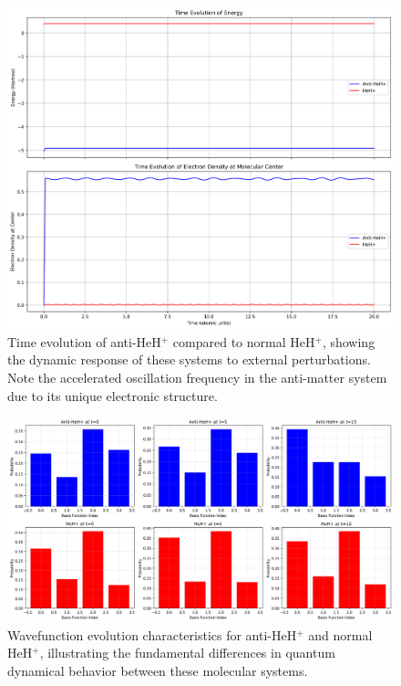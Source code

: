 \documentclass[10pt,twocolumn,a4paper]{article}
\begin{document}
\begin{figure}[t!]
    \centering
    \includegraphics[width=\columnwidth]{graphs/corrected_time_evolution.png}
    \caption{Time evolution of anti-HeH$^+$ compared to normal HeH$^+$, showing the dynamic response of these systems to external perturbations. Note the accelerated oscillation frequency in the anti-matter system due to its unique electronic structure.}
    \label{fig:time_evolution}
\end{figure}

\begin{figure}[t!]
    \centering
    \includegraphics[width=\columnwidth]{graphs/corrected_wavefunction_evolution.png}
    \caption{Wavefunction evolution characteristics for anti-HeH$^+$ and normal HeH$^+$, illustrating the fundamental differences in quantum dynamical behavior between these molecular systems.}
    \label{fig:wavefunction_evolution}
\end{figure}
\end{document}
